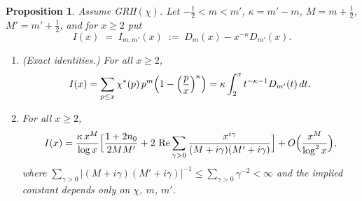 \documentclass[11pt]{amsart}
\newtheorem{proposition}[theorem]{Proposition}
\theoremstyle{definition}
\numberwithin{equation}{section}
\newcommand{\re}{\operatorname{Re}}
\begin{document}
\begin{proposition}\label{prop:formula}
Assume GRH$(\chi)$. Let $-\tfrac12<m<m'$, $\kappa=m'-m$,
$M=m+\tfrac12$, $M'=m'+\tfrac12$, and for $x\ge2$ put
\begin{equation}\label{eq:defI}
I(x)\;=\;I_{m,m'}(x)\;:=\;D_m(x)-x^{-\kappa}D_{m'}(x) .
\end{equation}
\begin{enumerate}
\item[(a)] (Exact identities.) For all $x\ge2$,
\[
I(x)=\sum_{p\le x}\chi^*(p)\,p^m\Bigl(1-\Bigl(\frac px\Bigr)^{\kappa}\Bigr)
=\kappa\int_2^xt^{-\kappa-1}D_{m'}(t)\,dt .
\]
\item[(b)] For all $x\ge2$,
\begin{equation}\label{eq:formula}
I(x)=\frac{\kappa\,x^{M}}{\log x}\Bigl[\frac{1+2n_0}{2MM'}
+2\,\re\sum_{\gamma>0}\frac{x^{i\gamma}}{(M+i\gamma)(M'+i\gamma)}\Bigr]
+O\Bigl(\frac{x^{M}}{\log^2x}\Bigr),
\end{equation}
where $\sum_{\gamma>0}|(M+i\gamma)(M'+i\gamma)|^{-1}
\le\sum_{\gamma>0}\gamma^{-2}<\infty$ and the implied constant depends
only on $\chi$, $m$, $m'$.
\end{enumerate}
\end{proposition}
\end{document}

